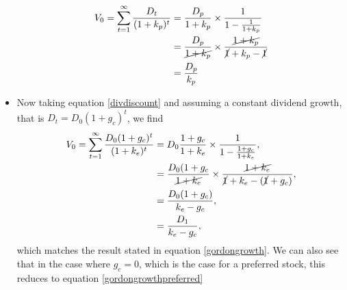 \documentclass[../notes_compiled.tex]{subfiles}
\begin{document}
\begin{itemize}
\begin{align}
V_{0} = \sum_{t=1}^{\infty} \frac{D_{t}}{(1+k_{p})^{t}} &=\frac{D_{p}}{1+k_{p}} \times \frac{1}{1-\frac{1}{1+k_{p}}} \nonumber \\
&=\frac{D_{p}}{\cancel{1+k_{p}}}\times\frac{\cancel{1+k_{p}}}{\cancel{1}+k_{p}-\cancel{1}} \nonumber \\
&=\frac{D_{p}}{k_{p}} \label{gordongrowthpreferred}
\end{align}
\item Now taking equation \ref{divdiscount} and assuming a constant dividend growth, that is $D_{t} = D_{0}(1+g_{c})^{t}$, we find
\begin{align}
V_{0} = \sum_{t=1}^{\infty} \frac{D_{0}(1+g_{c})^{t}}{(1+k_{e})^{t}} &=D_{0}\frac{1+g_{c}}{1+k_{e}} \times \frac{1}{1-\frac{1+g_{c}}{1+k_{e}}}, \nonumber \\
&=\frac{D_{0}(1+g_{c}}{\cancel{1+k_{e}}}\times\frac{\cancel{1+k_{e}}}{\cancel{1}+k_{e}-(\cancel{1}+g_{c})}, \nonumber \\
&=\frac{D_{0}(1+g_{c})}{k_{e}-g_{c}}, \nonumber \\
&=\frac{D_{1}}{k_{e}-g_{c}}, \label{gordongrowth2}
\end{align}
which matches the result stated in equation \ref{gordongrowth}. We can also see that in the case where $g_{c}=0$, which is the case for a preferred stock, this reduces to equation \ref{gordongrowthpreferred}

\end{itemize}
\end{document}
